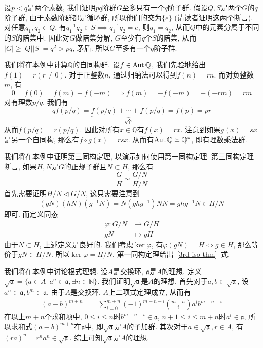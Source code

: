 \begin{eg}
    设$p<q$是两个素数, 我们证明$pq$阶群$G$至多只有一个$q$阶子群.
    假设$Q,S$是两个$G$的$q$阶子群, 由于素数阶群都是循环群, 所以他们的交为$\{e\}$ (请读者证明这两个断言).
    对任意$q_1,q_2\in Q$, 有$q_1^{-1}q_2\in S\implies q_1^{-1}q_2=e$, 则$q_1=q_2$, 从而$Q$中的元素分属于不同的$S$的陪集中.
    因此对$G$做陪集分解, $G$至少有$q$个$S$的陪集, 从而$|G|\geq |Q||S|=q^2>pq$, 矛盾.
    所以$G$至多有一个$q$阶子群.
\end{eg}

\begin{eg}
    我们将在本例中计算$\mathbb{Q}$的自同构群.
    设$f\in\operatorname{Aut}\mathbb{Q}$, 我们先验地给出$f(1)=r(r\neq 0)$.
    对于正整数$n$, 通过归纳法可以得到$f(n)=rn$.
    而对负整数$m$, 有
    \[0=f(0)=f(m)+f(-m)\implies f(m)=-f(-m)=-(-rm)=rm\]
    对有理数$p/q$, 我们有
    \[qf(p/q)=\underbrace{f(p/q)+\cdots+f(p/q)}_{{q\text{个}}}=f(p)=pr\]
    从而$f(p/q)=r(p/q)$.
    因此对所有$x\in\mathbb{Q}$有$f(x)=rx$.
    注意到如果$g(x)=sx$是另一个自同构, 那么有$f\circ g(x)=rsx$.
    从而有$\operatorname{Aut}\mathbb{Q}\simeq\mathbb{Q}^*$, 即有理数乘法群.
\end{eg}

\begin{eg}
    我们将在本例中证明第三同构定理, 以演示如何使用第一同构定理.
    第三同构定理断言, 如果$H,N$是$G$的正规子群且$N\subset H$, 那么有
    \begin{equation}
        \frac{G}{H}\simeq\frac{G/N}{H/N}\label{3rd iso thm}
    \end{equation}
    首先需要证明$H/N\lhd G/N$, 这只需要注意到
    \[(gN)(hN)(g^{-1}N)=N(ghg^{-1})NN=ghg^{-1}N\in H/N\]
    即可.
    而定义同态
    \begin{align*}
        \varphi:G/N&\to G/H\\
        gN&\mapsto gH
    \end{align*}
    由于$N\subset H$, 上述定义是良好的.
    我们考虑$\ker\varphi$, 有$\varphi(gN)=H\iff g\in H$, 那么等价于$gN\in H/N$.
    所以$\ker\varphi=H/N$, 第一同构定理给出~\eqref{3rd iso thm}~式.
\end{eg}

\begin{eg}
    我们将在本例中讨论根式理想.
    设$A$是交换环, $\mathfrak{a}$是$A$的理想.
    定义$\sqrt{\mathfrak{a}}=\{a\in A|\ a^n\in\mathfrak{a},\exists n\in\mathbb{N}\}$.
    我们证明$\sqrt{\mathfrak{a}}$是$A$的理想.
    首先对于$a,b\in\sqrt{\mathfrak{a}}$, 设$a^n\in\mathfrak{a},b^m\in\mathfrak{a}$.
    由于$A$是交换环, $A$上二项式定理成立, 从而有
    \begin{align}
        (a-b)^{m+n}&=\sum_{i=0}^{m+n}(-1)^{m+n-i}\binom{m+n}{i}a^ib^{m+n-i}
    \end{align}
    在以上$m+n$个求和项中, $0\leq i\leq n$时$b^{m+n-i}\in\mathfrak{a}$, $n+1\leq i\leq m+n$时$a^i\in\mathfrak{a}$, 所以求和式$(a-b)^{m+n}$在$\mathfrak{a}$中, 即$\sqrt{\mathfrak{a}}$是$A$的子加群.
    其次对于$a\in\sqrt{\mathfrak{a}},r\in A$, 有$(ra)^n=r^na^n\in\sqrt{\mathfrak{a}}$.
    综上可知$\sqrt{\mathfrak{a}}$是$A$的理想.
\end{eg}

